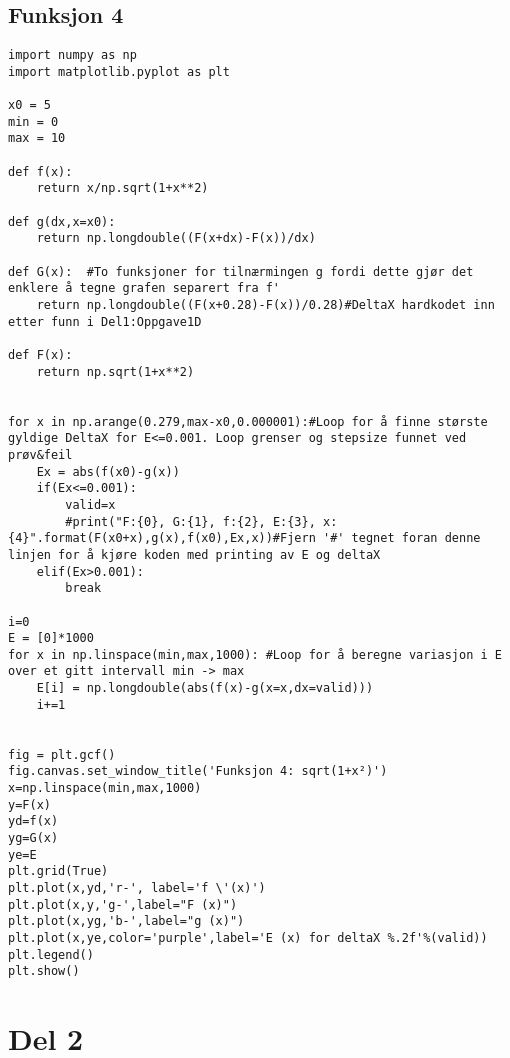 \subsection{Funksjon 4}
\label{app:func4}
\begin{lstlisting}
import numpy as np
import matplotlib.pyplot as plt 

x0 = 5
min = 0
max = 10

def f(x):
    return x/np.sqrt(1+x**2)

def g(dx,x=x0):
    return np.longdouble((F(x+dx)-F(x))/dx)

def G(x):  #To funksjoner for tilnærmingen g fordi dette gjør det enklere å tegne grafen separert fra f'
    return np.longdouble((F(x+0.28)-F(x))/0.28)#DeltaX hardkodet inn etter funn i Del1:Oppgave1D

def F(x):
    return np.sqrt(1+x**2)


for x in np.arange(0.279,max-x0,0.000001):#Loop for å finne største gyldige DeltaX for E<=0.001. Loop grenser og stepsize funnet ved prøv&feil
    Ex = abs(f(x0)-g(x))
    if(Ex<=0.001):
        valid=x
        #print("F:{0}, G:{1}, f:{2}, E:{3}, x:{4}".format(F(x0+x),g(x),f(x0),Ex,x))#Fjern '#' tegnet foran denne linjen for å kjøre koden med printing av E og deltaX
    elif(Ex>0.001):
        break

i=0
E = [0]*1000
for x in np.linspace(min,max,1000): #Loop for å beregne variasjon i E over et gitt intervall min -> max
    E[i] = np.longdouble(abs(f(x)-g(x=x,dx=valid)))
    i+=1


fig = plt.gcf()
fig.canvas.set_window_title('Funksjon 4: sqrt(1+x²)')
x=np.linspace(min,max,1000)
y=F(x)
yd=f(x)
yg=G(x)
ye=E
plt.grid(True)
plt.plot(x,yd,'r-', label='f \'(x)')
plt.plot(x,y,'g-',label="F (x)")
plt.plot(x,yg,'b-',label="g (x)")
plt.plot(x,ye,color='purple',label='E (x) for deltaX %.2f'%(valid))
plt.legend()    
plt.show()
\end{lstlisting}

\section{Del 2}
